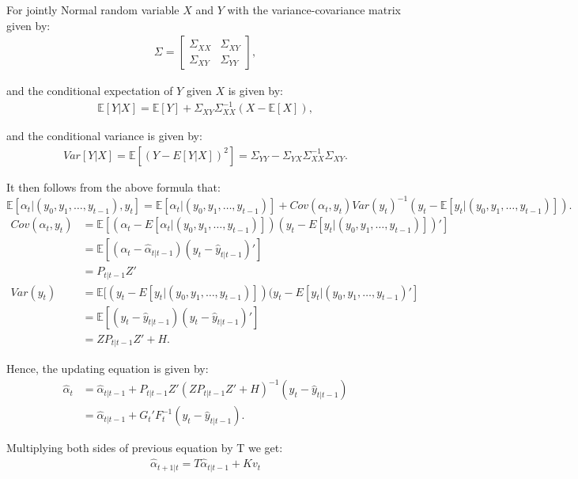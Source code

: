 \documentclass{article}
\begin{document}
	For jointly Normal random variable $X$ and $Y$ with the variance-covariance matrix given by:
	\begin{align*}
		\Sigma = \begin{bmatrix}
		\Sigma_{XX} & \Sigma_{XY} \\
		\Sigma_{XY} & \Sigma_{YY}
		\end{bmatrix},
	\end{align*}
	
	and the conditional expectation of $Y$ given $X$ is given by:
	\begin{align*}
		\mathds{E}[Y|X] = \mathds{E}[Y] + \Sigma_{XY} \Sigma_{XX}^{-1}(X - \mathds{E}[X]),
	\end{align*}
	
	and the conditional variance is given by:
	\begin{align*}
		Var[Y|X] = \mathds{E}[(Y - E[Y|X])^2] = \Sigma_{YY} - \Sigma_{YX}\Sigma_{XX}^{-1}\Sigma_{XY}.
	\end{align*}
	
	It then follows from the above formula that:
	$$
		\mathds{E}[\alpha_t| (y_0, y_1, \dots, y_{t-1}), y_t]=\mathds{E}[\alpha_t|(y_0, y_1, \dots, y_{t-1})] + Cov(\alpha_t, y_t)Var(y_t)^{-1}(y_t - \mathds{E}[y_t | (y_0, y_1, \dots, y_{t-1})]).
	$$
	\begin{align*}
		Cov(\alpha_t, y_t ) &  = \mathds{E}[(\alpha_t - E[\alpha_t|(y_0, y_1, \dots, y_{t-1})])(y_t - E[y_t | (y_0, y_1, \dots, y_{t-1})])']\\
		& = \mathds{E}[(\alpha_t - \hat{\alpha}_{t|t-1})(y_t - \hat{y}_{t|t-1})']\\
		& = P_{t|t-1}Z' \\
		Var(y_t) & = \mathds{E}[(y_t - E[y_t|(y_0, y_1, \dots, y_{t-1})])(y_t - E[y_t|(y_0, y_1, \dots, y_{t-1})']\\
		& = \mathds{E}[(y_t - \hat{y}_{t|t-1})(y_t - \hat{y}_{t|t-1} )']\\
		& = ZP_{t|t-1}Z' + H.
	\end{align*}
	
	Hence, the updating equation is given by:
	\begin{align*}
		\hat{\alpha}_t & = \hat{\alpha}_{t|t-1} + P_{t|t-1}Z'(ZP_{t|t-1}Z' + H)^{-1}(y_t - \hat{y}_{t|t-1})\\
		& =  \hat{\alpha}_{t|t-1} + G_t' F_t^{-1}(y_t - \hat{y}_{t|t-1}).
	\end{align*}
	
	Multiplying both sides of previous equation by T we get:
	\begin{align*}
		\hat{\alpha}_{t+1|t} = T\hat{\alpha}_{t|t-1} + K v_t
	\end{align*}
	
\end{document}
